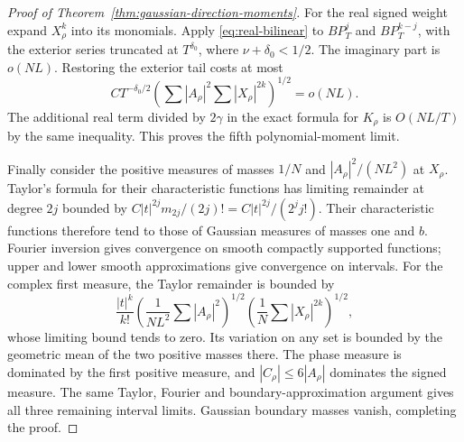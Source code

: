 \begin{proof}[Proof of Theorem~\ref{thm:gaussian-direction-moments}]
For the real signed weight expand $X_\rho^k$ into its monomials.
Apply \eqref{eq:real-bilinear} to $BP_T^j$ and $BP_T^{k-j}$, with
the exterior series truncated at $T^{\delta_0}$, where
$\nu+\delta_0<1/2$. The imaginary part is $o(NL)$.
Restoring the exterior tail costs at most
\[
 C T^{-\delta_0/2}
 \left(\sum|A_\rho|^2\sum|X_\rho|^{2k}\right)^{1/2}=o(NL).
\]
The additional real term divided by $2\gamma$ in the exact formula
for $K_\rho$ is $O(NL/T)$ by the same inequality. This proves the
fifth polynomial-moment limit.

Finally consider the positive measures of masses $1/N$ and
$|A_\rho|^2/(NL^2)$ at $X_\rho$. Taylor's formula for their
characteristic functions has limiting remainder at degree $2j$
bounded by $C|t|^{2j}m_{2j}/(2j)!=C|t|^{2j}/(2^jj!)$.
Their characteristic functions therefore tend to those of Gaussian
measures of masses one and $b$. Fourier inversion gives convergence
on smooth compactly supported functions; upper and lower smooth
approximations give convergence on intervals.
For the complex first measure, the Taylor remainder is bounded by
\[
 \frac{|t|^k}{k!}
 \left(\frac1{NL^2}\sum|A_\rho|^2\right)^{1/2}
 \left(\frac1N\sum|X_\rho|^{2k}\right)^{1/2},
\]
whose limiting bound tends to zero. Its variation on any set is
bounded by the geometric mean of the two positive masses there.
The phase measure is dominated by the first positive measure, and
$|C_\rho|\le6|A_\rho|$ dominates the signed measure. The same Taylor,
Fourier and boundary-approximation argument gives all three remaining
interval limits. Gaussian boundary masses vanish, completing the proof.
\end{proof}
